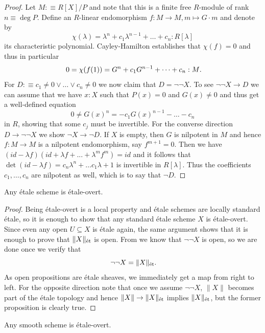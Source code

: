 \begin{proof}
  Let $M :\equiv R[X]/P$ and note that this is a finite free $R$-module of rank $n \equiv \deg P$.
  Define an $R$-linear endomorphism $f : M \to M , m \mapsto G \cdot m$ and denote by
  \[
    \chi(\lambda) = \lambda^n + c_1\lambda^{n-1} + \dots + c_n : R[\lambda]
  \]
  its characteristic polynomial.
  Cayley-Hamilton establishes that $\chi (f) = 0$ and thus in particular
  \[
    0 = \chi (f(1)) = G^n + c_1G^{n-1} + \dots + c_n : M\rlap{.}
  \]
  For $D :\equiv c_1 \neq 0 \lor \dots \lor c_n \neq 0$ we now claim that $D = \neg\neg X$.
  To see $\neg\neg X \to D$ we can assume that we have $x:X$ such that $P(x) = 0$ and $G(x)\neq 0$ and thus get a well-defined equation
  \[
    0 \neq G(x)^n = -c_1G(x)^{n-1} - \dots - c_n
  \]
  in $R$, showing that some $c_j$ must be invertible.
  For the converse direction $D \to \neg\neg X$ we show $\neg X \to \neg D$.
  If $X$ is empty, then $G$ is nilpotent in $M$ and hence $f : M \to M$ is a nilpotent endomorphism, say $f^{m+1}=0$.
  Then we have $(id - \lambda f)(id + \lambda f + ... + \lambda^m f^m) = id$ and it follows that $\det(id - \lambda f) = c_n\lambda^n + \dots c_1 \lambda + 1$ is invertible in $R[\lambda]$.
  Thus the coefficients $c_1,\dots,c_n$ are nilpotent as well, which is to say that $\neg D$.
\end{proof}

\begin{lemma}
  Any étale scheme is étale-overt.
\end{lemma}

\begin{proof}
  Being étale-overt is a local property and étale schemes are locally standard étale, so it is enough to show that any standard étale scheme $X$ is étale-overt.
  Since even any open $U \subseteq X$ is étale again, the same argument shows that it is enough to prove that $\|X\|_\et$ is open.
  From  we know that $\neg\neg X$ is open, so we are done once we verify that
  \[
    \neg\neg X = \|X\|_\et\rlap{.}
  \]
  As open propositions are étale sheaves, we immediately get a map from right to left. For the opposite direction note that once we assume $\neg\neg X$, $\|X\|$ becomes part of the étale topology and hence
  $\|X\| \to \|X\|_\et$ implies $\|X\|_\et$, but the former proposition is clearly true.
\end{proof}

\begin{theorem}
  \label{smooth-schemes-are-étale-overt}
  Any smooth scheme is étale-overt.
\end{theorem}

